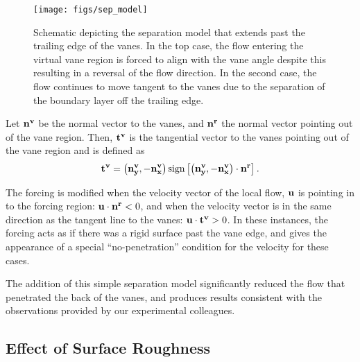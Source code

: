 \begin{figure}[!htb]
  \begin{center}
    \texttt{[image: figs/sep\_model]}
    \caption{Schematic depicting the separation model that extends past
   the trailing edge of the vanes. In the top case, the flow entering
   the virtual vane region is forced to align with the vane angle despite
   this resulting in a reversal of the flow direction. In the second
   case, the flow continues to move tangent to the vanes due to the
   separation of the boundary layer off the trailing edge.} 
    \label{fig:sep_model}
  \end{center}
\end{figure}

Let $\bf n^v$ be the normal vector to the vanes, and $\bf n^r$ the
normal vector pointing out of the vane region. Then, $\bf t^v$ is the
tangential vector to the vanes pointing out of the vane region and is
defined as
\begin{equation}
 \bf t^v = \left( {\bf n^v_y},{\bf -n_x^v} \right) \text{sign}\left[
	    \left( {\bf n^v_y},{\bf -n_x^v} \right) \cdot {\bf n^r} \right].
\end{equation}

The forcing is modified when the velocity vector of the local flow, $\bf
u$ is pointing in to the forcing region: ${\bf u} \cdot {\bf n^r} < 0$, and
when the velocity vector is in the same direction as the tangent line to
the vanes: ${\bf u} \cdot {\bf t^v} > 0 $. In these instances, the
forcing acts as if there was a rigid surface past the vane edge, and
gives the appearance of a special ``no-penetration'' condition for the
velocity for these cases.  

The addition of this simple separation model significantly reduced the
flow that penetrated the back of the vanes, and produces results
consistent with the observations provided by our experimental
colleagues.  

\subsection{Effect of Surface Roughness}


